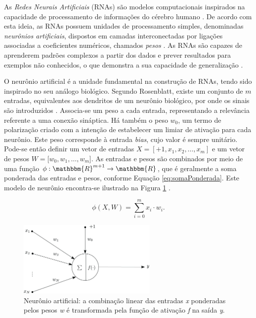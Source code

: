 
As \emph{Redes Neurais Artificiais} (RNAs) são modelos computacionais inspirados na capacidade de processamento de informações do cérebro humano \cite{ref:rojas}. De acordo com esta ideia, as RNAs possuem unidades de processamento simples, denominadas \emph{neurônios artificiais}, dispostos em camadas interconectadas por ligações associadas a coeficientes numéricos, chamados \emph{pesos} \cite{ref:faceli}. As RNAs são capazes de aprenderem padrões complexos a partir dos dados e prever resultados para exemplos não conhecidos, o que demonstra a sua capacidade de generalização \cite{ref:haykin}.


O neurônio artificial é a unidade fundamental na construção de RNAs, tendo sido inspirado no seu análogo biológico. Segundo Rosenblatt, existe um conjunto de $m$ entradas, equivalentes aos dendritos de um neurônio biológico, por onde os sinais são introduzidos \cite{ref:rosenblatt}. Associa-se um peso a cada entrada, representando a relevância referente a uma conexão sináptica. Há também o peso $w_0$, um termo de polarização criado com a intenção de estabelecer um limiar de ativação para cada neurônio. Este peso corresponde à entrada \emph{bias}, cujo valor é sempre unitário. Pode-se então definir um vetor de entradas $X = [+1, x_1, x_2, \ldots, x_m]$ e um vetor de pesos $W = [w_0, w_1, \ldots, w_m$]. As entradas e pesos são combinados por meio de uma função $\phi: \mathbbm{R}^{m+1} \rightarrow \mathbbm{R}$, que é geralmente a soma ponderada das entradas e pesos, conforme Equação \ref{eq:somaPonderada}. Este modelo de neurônio encontra-se ilustrado na Figura \ref{img:neuronioArtificial} \cite{ref:patrick-tcc}.

\begin{equation}
\phi(X,W) = \sum_{i =0}^m x_i \cdot w_i. \label{eq:somaPonderada}
\end{equation}

\begin{figure}[!ht]
	\centering
\includegraphics[width=0.6\textwidth]{./img/neuron}
\caption{Neurônio artificial: a combinação linear das entradas \emph{x} ponderadas pelos pesos \emph{w} é transformada pela função de ativação \emph{f} na saída \emph{y}.}
\label{img:neuronioArtificial}
\end{figure}

